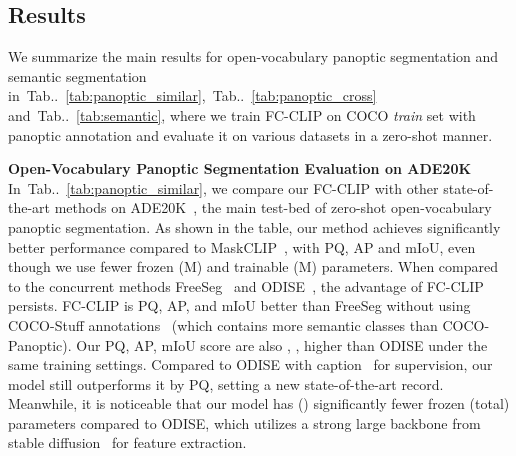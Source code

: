 \documentclass{article}
\makeatletter
\DeclareRobustCommand\onedot{\futurelet\@let@token\@onedot}
\def\@onedot{\ifx\@let@token.\else.\null\fi\xspace}
\newcommand{\tabref}[1]{Tab\onedot~\ref{#1}}
\newcommand{\modelname}{FC-CLIP\xspace}
\makeatother
\begin{document}
\subsection{Results}
\label{sec:main_results}
We summarize the main results for open-vocabulary panoptic segmentation and semantic segmentation in~\tabref{tab:panoptic_similar},~\tabref{tab:panoptic_cross} and~\tabref{tab:semantic}, where we train \modelname on COCO \textit{train} set with panoptic annotation and evaluate it on various datasets in a zero-shot manner.

\noindent \textbf{Open-Vocabulary Panoptic Segmentation Evaluation on ADE20K}\quad
In~\tabref{tab:panoptic_similar}, we compare our \modelname with other state-of-the-art methods on ADE20K~\cite{zhou2017scene}, the main test-bed of zero-shot open-vocabulary panoptic segmentation.
As shown in the table, our method achieves significantly better performance compared to MaskCLIP~\cite{ding2022open}, with  PQ,  AP and  mIoU, even though we use fewer frozen (M) and trainable (M) parameters.
When compared to the concurrent methods FreeSeg~\cite{qin2023freeseg} and ODISE~\cite{xu2023open}, the advantage of \modelname persists.
\modelname is  PQ,  AP, and  mIoU better than FreeSeg without using COCO-Stuff annotations~\cite{caesar2018coco} (which contains more semantic classes than COCO-Panoptic).
Our PQ, AP, mIoU score are also , ,  higher than ODISE under the same training settings.
Compared to ODISE with caption~\cite{chen2015microsoft} for supervision, our model still outperforms it by  PQ, setting a new state-of-the-art record. Meanwhile, it is noticeable that our model has  () significantly fewer frozen (total) parameters compared to ODISE, which utilizes a strong large backbone from stable diffusion~\cite{rombach2022high} for feature extraction.
\end{document}
